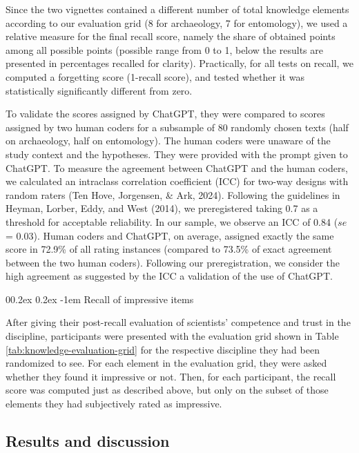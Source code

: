 \documentclass[
  english,
  doc,floatsintext]{apa6}
\makeatletter
\let\oldparagraph\paragraph
\renewcommand{\paragraph}{
    \@ifstar
      \xxxParagraphStar
      \xxxParagraphNoStar
  }
\newcommand{\xxxParagraphStar}[1]{\oldparagraph*{#1}\mbox{}}
\newcommand{\xxxParagraphNoStar}[1]{\oldparagraph{#1}\mbox{}}
\renewcommand{\paragraph}{\@startsection{paragraph}{4}{\parindent}%
  {0\baselineskip \@plus 0.2ex \@minus 0.2ex}%
  {-1em}%
  {\normalfont\normalsize\bfseries\itshape\typesectitle}}
\makeatother
\begin{document}
Since the two vignettes contained a different number of total knowledge elements according to our evaluation grid (8 for archaeology, 7 for entomology), we used a relative measure for the final recall score, namely the share of obtained points among all possible points (possible range from 0 to 1, below the results are presented in percentages recalled for clarity). Practically, for all tests on recall, we computed a forgetting score (1-recall score), and tested whether it was statistically significantly different from zero.

To validate the scores assigned by ChatGPT, they were compared to scores assigned by two human coders for a subsample of 80 randomly chosen texts (half on archaeology, half on entomology). The human coders were unaware of the study context and the hypotheses. They were provided with the prompt given to ChatGPT. To measure the agreement between ChatGPT and the human coders, we calculated an intraclass correlation coefficient (ICC) for two-way designs with random raters (Ten Hove, Jorgensen, \& Ark, 2024). Following the guidelines in Heyman, Lorber, Eddy, and West (2014), we preregistered taking 0.7 as a threshold for acceptable reliability. In our sample, we observe an ICC of 0.84 (\(se\) = 0.03). Human coders and ChatGPT, on average, assigned exactly the same score in 72.9\% of all rating instances (compared to 73.5\% of exact agreement between the two human coders). Following our preregistration, we consider the high agreement as suggested by the ICC a validation of the use of ChatGPT.

\paragraph{Recall of impressive items}\label{recall-of-impressive-items}

After giving their post-recall evaluation of scientists' competence and trust in the discipline, participants were presented with the evaluation grid shown in Table \ref{tab:knowledge-evaluation-grid} for the respective discipline they had been randomized to see. For each element in the evaluation grid, they were asked whether they found it impressive or not. Then, for each participant, the recall score was computed just as described above, but only on the subset of those elements they had subjectively rated as impressive.

\subsection{Results and discussion}\label{results-and-discussion-1}
\end{document}
